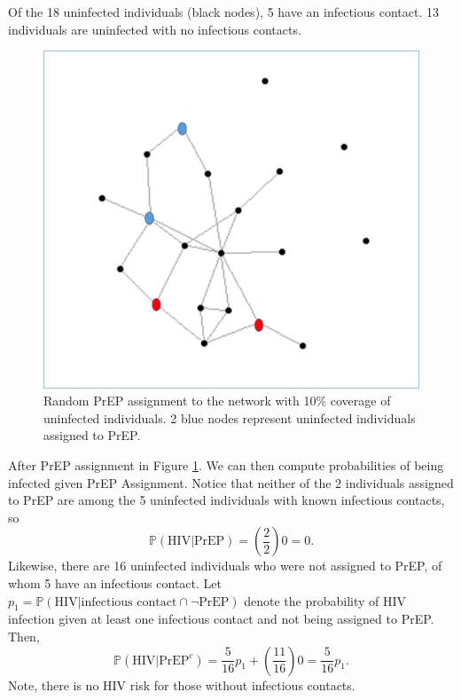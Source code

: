 \documentclass{article}
\theoremstyle{definition}
\begin{document}
 Of the 18 uninfected individuals (black nodes), 5 have an infectious contact. 13 individuals are uninfected with no infectious contacts.
\begin{figure}[H]
    \centering
    \includegraphics[scale=0.5]{Figures/Network Example 2.png}
    \caption{Random PrEP assignment to the network with 10\% coverage of uninfected individuals. 2 blue nodes represent uninfected individuals assigned to PrEP.}
    \label{fig:Figure 3}
\end{figure}

After PrEP assignment in Figure \ref{fig:Figure 3}. We can then compute probabilities of being infected given PrEP Assignment. Notice that neither of the 2 individuals assigned to PrEP are among the 5 uninfected individuals with known infectious contacts, so $$\mathbb{P}\left(\text{HIV}\vert \text{PrEP}\right)=\left(\frac{2}{2}\right)0=0.$$
Likewise, there are 16 uninfected individuals who were not assigned to PrEP, of whom 5 have an infectious contact. Let $p_{1}=\mathbb{P}\left(\text{HIV} \vert \text{infectious contact} \cap \neg \text{PrEP}\right)$ denote the probability of HIV infection given at least one infectious contact and not being assigned to PrEP.  Then, $$\mathbb{P}\left(\text{HIV} \vert \text{PrEP}^c\right)=\frac{5}{16}p_{1}+\left(\frac{11}{16}\right)0=\frac{5}{16}p_{1}.$$ Note, there is no HIV risk for those without infectious contacts.
\end{document}
